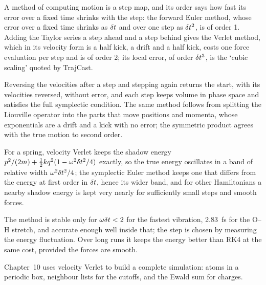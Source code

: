
A method of computing motion is a step map, and its order says how fast
its error over a fixed time shrinks with the step: the forward Euler
method, whose error over a fixed time shrinks as $\delta t$ and over one step
as $\delta t^2$, is of order 1. Adding the Taylor
series a step ahead and a step behind gives the Verlet method, which in
its velocity form is a half kick, a drift and a half kick, costs one force
evaluation per step and is of order 2; its local error, of order
$\delta t^3$, is the `cubic scaling' quoted by TrajCast.

Reversing the
velocities after a step and stepping again returns the start, with its
velocities reversed, without error, and each step keeps
volume in phase space and satisfies the full symplectic condition. The
same method follows from splitting the Liouville operator into the parts
that move positions and momenta, whose exponentials are a drift and a kick
with no error; the symmetric product agrees with the true motion to second
order.

For a spring, velocity Verlet keeps the shadow energy $p^2/(2m) +
\frac12 kq^2(1 - \omega^2\delta t^2/4)$ exactly, so the true energy oscillates
in a band of relative width $\omega^2\delta t^2/4$; the symplectic Euler
method keeps one that differs from the energy at first order in $\delta t$,
hence its wider band, and for other Hamiltonians a nearby shadow energy
is kept very nearly for sufficiently small steps and smooth forces.

The method is stable only for
$\omega\delta t < 2$ for the fastest vibration, \SI{2.83}{\femto\second} for
the O--H stretch, and accurate enough well inside that; the step is chosen
by measuring the energy fluctuation. Over long runs it keeps the energy
better than RK4 at the same cost, provided the forces are smooth.

Chapter~10 uses velocity Verlet to build a complete simulation: atoms in a
periodic box, neighbour lists for the cutoffs, and the Ewald sum for
charges.

